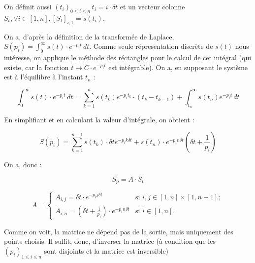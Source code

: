 \documentclass[11pt]{article} %
\begin{document}
On définit aussi \begin{math} (t_i)_{0 \leq i \leq n} \, t_i = i \cdot \delta t \end{math} et un vecteur colonne \begin{math} S_t ,  \forall i \in [1,n],  [S_t]_{i,1} = s(t_i) \end{math}.

On a, d'après la définition de la transformée de Laplace, \begin{math}  S(p_i) = \int_{0}^{\infty} s(t) \cdot e^{-p_i t}\,dt\end{math}. Comme seule répresentation discrète de \begin{math} s(t) \end{math} nous intéresse, on applique le méthode des réctangles pour le calcul de cet intégral (qui existe, car la fonction \begin{math} t \mapsto C \cdot e^{-p_i t}\end{math} est intégrable). On a, en supposant le système est à l'équilibre à l'instant \begin{math} t_n \end{math} :

\begin{equation}  \int_{0}^{\infty} s(t) \cdot e^{-p_i t}\,dt = \sum_{k=1}^{n} s(t_k) e^{-p_i t_k} \cdot (t_k - t_{k-1}) + \int_{t_n}^{\infty} s(t_n) e^{-p_i t} \, dt \end{equation}

En simplifiant et en calculant la valeur d'intégrale, on obtient : 

\begin{equation} S(p_i) = \sum_{k=1}^{n-1} s(t_k) \cdot \delta t e^{-p_i k \delta t} + s(t_n) \cdot e^{-p_i n \delta t}(\delta t  + \frac{1}{p_i})\end{equation}

On a, donc :

\begin{equation} S_p = A \cdot S_t \end{equation} 

\[ A  = \left\{  \begin{array}{ll}
         A_{i,j} = \delta t \cdot e^{-p_i j \delta t} & \mbox{si ${i,j} \in {[1,n] \times [1,n-1]}$}; \\
         A_{i,n} = (\delta t + \frac{1}{p_i}) \cdot e^{-p_i n \delta t}  & \mbox{si $i \in {[1,n]}$}. \end{array} \right. \] 

Comme on voit, la matrice ne dépend pas de la sortie, mais uniquement des points choisis. Il suffit, donc, d'inverser la matrice (à condition que les \begin{math} (p_i)_{1 \leq i \leq n}\end{math} sont disjoints et la matrice est inversible)
\end{document}

